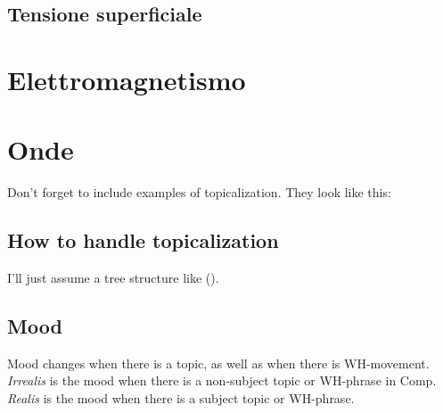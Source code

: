 \documentclass[12pt]{article}
\begin{document}
    \subsection{Tensione superficiale}
\section{Elettromagnetismo}
\section{Onde}

Don't forget to include examples of topicalization.
They look like this:

{\small
{}
}

\subsection*{How to handle topicalization}

I'll just assume a tree structure like ().

{\small
{}
}

\subsection{Mood}

Mood changes when there is a topic, as well as when
there is WH-movement.  \emph{Irrealis} is the mood when
there is a non-subject topic or WH-phrase in Comp.
\emph{Realis} is the mood when there is a subject topic
or WH-phrase.
\end{document}
